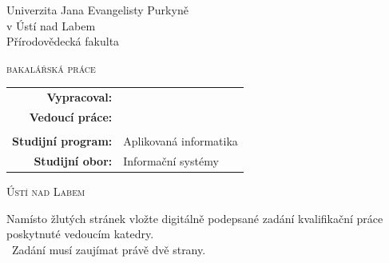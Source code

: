 \documentclass[male,czech]{kitheses}
\newcommand{\ZT}[1]{\colorbox{yellow}{\color{red}{#1}}}
\newcommand{\univerzita}{Univerzita Jana Evangelisty Purkyně \\v Ústí nad Labem}
\newcommand{\fakulta}{Přírodovědecká fakulta}
\newcommand{\program}{Aplikovaná informatika}
\newcommand{\obor}{Informační systémy}
\newcommand{\nazevcz}{\ZT{Závěrečná práce na KI PřF UJEP}}        %
\newcommand{\autor}{\ZT{Jiří Fišer}}           %
\newcommand{\rok}{\the\year}
\newcommand{\vedouci}{\ZT{RNDr. Jiří Škvor, Ph.D.}}
\begin{document}
\thispagestyle{empty}
\begin{center}
{
\LARGE
\univerzita\\[16pt]
\fakulta
}

\vspace{2cm}

\vspace{2cm}
{
\Huge\sffamily
\nazevcz\par
\vspace{0.6cm}
\Large\scshape bakalářská práce
}
\end{center} 
 
\vfill
{
\large
\begin{tabular}{>{\bfseries}rl}
    Vypracoval: 	& \autor\\
    Vedoucí práce: 	& \vedouci\\
&\\
Studijní program:       & \program\\
Studijní obor:          & \obor\\
\end{tabular} 
}
\vspace{1.5cm}
\begin{center}
  \Large\scshape   Ústí nad Labem \rok
\end{center}

\cleardoublepage
\thispagestyle{empty}
\pagecolor{yellow}
{\Large Namísto žlutých stránek vložte digitálně podepsané zadání kvalifikační práce poskytnuté vedoucím katedry.\\\
Zadání musí zaujímat právě dvě strany.
}
\end{document}
